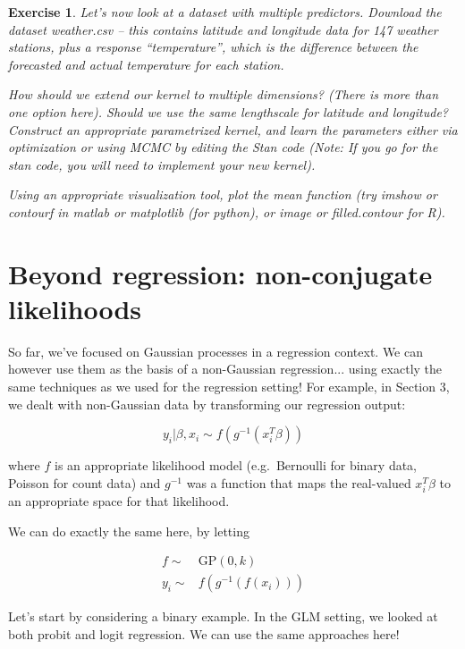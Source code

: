 \documentclass[twoside]{article}
\newcounter{lecnum}
\newtheorem{exercise}{Exercise}[lecnum]
\begin{document}
 \begin{exercise}
   Let's now look at a dataset with multiple predictors. Download the dataset weather.csv -- this contains latitude and longitude data for 147 weather stations, plus a response ``temperature'', which is the difference between the forecasted and actual temperature for each station.

   How should we extend our kernel to multiple dimensions? (There is more than one option here). Should we use the same lengthscale for latitude and longitude?  Construct an appropriate parametrized kernel, and learn the parameters either via optimization or using MCMC by editing the Stan code (Note: If you go for the stan code, you will need to implement your new kernel).

   Using an appropriate visualization tool, plot the mean function (try imshow or contourf in matlab or matplotlib (for python), or image or filled.contour for R).
 \end{exercise}



   


 
 \section{Beyond regression: non-conjugate likelihoods}

 So far, we've focused on Gaussian processes in a regression context. We can however use them as the basis of a non-Gaussian regression... using exactly the same techniques as we used for the regression setting! For example, in Section 3, we dealt with non-Gaussian data by transforming our regression output:

 $$y_i|\beta,x_i \sim f(g^{-1}(x_i^T\beta))$$

 where $f$ is an appropriate likelihood model (e.g.\ Bernoulli for binary data, Poisson for count data) and $g^{-1}$ was a function that maps the real-valued $x_i^T\beta$ to an appropriate space for that likelihood.


 We can do exactly the same here, by letting

 $$\begin{aligned}f \sim& \mbox{GP}(0, k)\\
   y_i \sim&f(g^{-1}(f(x_i)))\end{aligned}
 $$


 Let's start by considering a binary example. In the GLM setting, we looked at both probit and logit regression. We can use the same approaches here!
\end{document}
